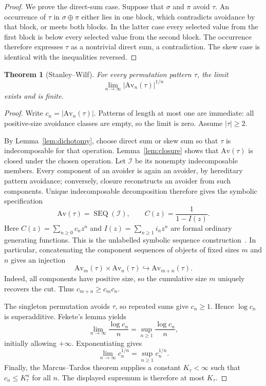 \documentclass[10pt]{article}
\newtheorem{theorem}{Theorem}
\newcommand{\Av}{\mathrm{Av}}
\newcommand{\SEQ}{\operatorname{SEQ}}
\begin{document}
\begin{proof}
We prove the direct-sum case.  Suppose that $\sigma$ and $\pi$ avoid $\tau$.
An occurrence of $\tau$ in $\sigma\oplus\pi$ either lies in one block, which
contradicts avoidance by that block, or meets both blocks.  In the latter
case every selected value from the first block is below every selected value
from the second block.  The occurrence therefore expresses $\tau$ as a
nontrivial direct sum, a contradiction.  The skew case is identical with the
inequalities reversed.
\end{proof}

\begin{theorem}[Stanley--Wilf]
For every permutation pattern $\tau$, the limit
\[
  \lim_{n\to\infty}|\Av_n(\tau)|^{1/n}
\]
exists and is finite.
\end{theorem}

\begin{proof}
Write $c_n=|\Av_n(\tau)|$.  Patterns of length at most one are immediate: all
positive-size avoidance classes are empty, so the limit is zero.  Assume
$|\tau|\geq2$.

By Lemma~\ref{lem:dichotomy}, choose direct sum or skew sum so that $\tau$ is
indecomposable for that operation.  Lemma~\ref{lem:closure} shows that
$\Av(\tau)$ is closed under the chosen operation.  Let $\mathcal I$ be its
nonempty indecomposable members.  Every component of an avoider is again an
avoider, by hereditary pattern avoidance; conversely, closure reconstructs an
avoider from such components.  Unique indecomposable decomposition therefore
gives the symbolic specification
\[
  \Av(\tau)=\SEQ(\mathcal I),
  \qquad C(z)=\frac{1}{1-I(z)}.
\]
Here $C(z)=\sum_{n\geq0}c_nz^n$ and
$I(z)=\sum_{n\geq1}i_nz^n$ are formal ordinary generating functions.
This is the unlabelled symbolic sequence construction~\cite{FlajoletSedgewick}.
In particular, concatenating the component sequences of objects of fixed
sizes $m$ and $n$ gives an injection
\[
  \Av_m(\tau)\times\Av_n(\tau)\hookrightarrow\Av_{m+n}(\tau).
\]
Indeed, all components have positive size, so the cumulative size $m$
uniquely recovers the cut.
Thus $c_{m+n}\geq c_mc_n$.

The singleton permutation avoids $\tau$, so repeated sums give $c_n\geq1$.
Hence $\log c_n$ is superadditive.  Fekete's lemma yields
\[
  \lim_{n\to\infty}\frac{\log c_n}{n}
    =\sup_{n\geq1}\frac{\log c_n}{n},
\]
initially allowing $+\infty$.  Exponentiating gives
\[
  \lim_{n\to\infty}c_n^{1/n}=\sup_{n\geq1}c_n^{1/n}.
\]
Finally, the Marcus--Tardos theorem supplies a constant $K_\tau<\infty$ such
that $c_n\leq K_\tau^n$ for all $n$.  The displayed supremum is therefore at
most $K_\tau$.
\end{proof}
\end{document}
